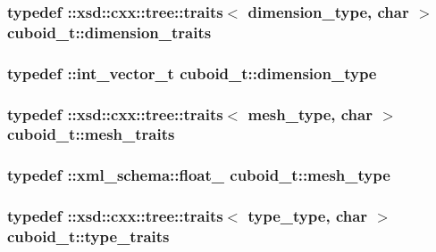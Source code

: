 \subsubsection[{\texorpdfstring{dimension\+\_\+traits}{dimension_traits}}]{\setlength{\rightskip}{0pt plus 5cm}typedef \+::xsd\+::cxx\+::tree\+::traits$<$ {\bf dimension\+\_\+type}, char $>$ {\bf cuboid\+\_\+t\+::dimension\+\_\+traits}}\hypertarget{classcuboid__t_aed028730d651f8447c9243431c31b176}{}\label{classcuboid__t_aed028730d651f8447c9243431c31b176}
\subsubsection[{\texorpdfstring{dimension\+\_\+type}{dimension_type}}]{\setlength{\rightskip}{0pt plus 5cm}typedef \+::{\bf int\+\_\+vector\+\_\+t} {\bf cuboid\+\_\+t\+::dimension\+\_\+type}}\hypertarget{classcuboid__t_a0992ec1724eb71e76babf752bbe9189b}{}\label{classcuboid__t_a0992ec1724eb71e76babf752bbe9189b}
\subsubsection[{\texorpdfstring{mesh\+\_\+traits}{mesh_traits}}]{\setlength{\rightskip}{0pt plus 5cm}typedef \+::xsd\+::cxx\+::tree\+::traits$<$ {\bf mesh\+\_\+type}, char $>$ {\bf cuboid\+\_\+t\+::mesh\+\_\+traits}}\hypertarget{classcuboid__t_a67db60662cfd845bfe24613ab89f75bb}{}\label{classcuboid__t_a67db60662cfd845bfe24613ab89f75bb}
\subsubsection[{\texorpdfstring{mesh\+\_\+type}{mesh_type}}]{\setlength{\rightskip}{0pt plus 5cm}typedef \+::{\bf xml\+\_\+schema\+::float\+\_\+} {\bf cuboid\+\_\+t\+::mesh\+\_\+type}}\hypertarget{classcuboid__t_a48025da79e9243b8b1e34e696c22e06d}{}\label{classcuboid__t_a48025da79e9243b8b1e34e696c22e06d}
\subsubsection[{\texorpdfstring{type\+\_\+traits}{type_traits}}]{\setlength{\rightskip}{0pt plus 5cm}typedef \+::xsd\+::cxx\+::tree\+::traits$<$ {\bf type\+\_\+type}, char $>$ {\bf cuboid\+\_\+t\+::type\+\_\+traits}}\hypertarget{classcuboid__t_af1801e353fa239baa79a76f6942f40f9}{}\label{classcuboid__t_af1801e353fa239baa79a76f6942f40f9}
